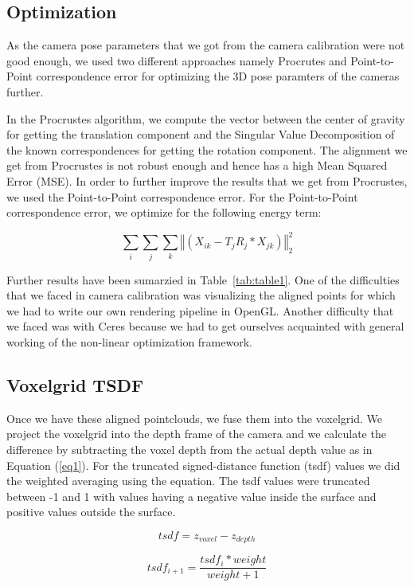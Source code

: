 \documentclass[10pt,twocolumn,letterpaper]{article}
\begin{document}
\subsection{Optimization}
As the camera pose parameters that we got from the camera calibration were not good enough, we used two different approaches namely Procrutes and Point-to-Point correspondence error for optimizing the 3D pose paramters of the cameras further.
 
In the Procrustes algorithm, we compute the vector between the center of gravity for getting the translation component and the Singular Value Decomposition of the known correspondences for getting the rotation component. The alignment we get from Procrustes is not robust enough and hence has a high Mean Squared Error (MSE). In order to further improve the results that we get from Procrustes, we used the Point-to-Point correspondence error. For the Point-to-Point correspondence error, we optimize for the following energy term:

$$
\sum_{i}\sum_{j}\sum_{k} \left\Vert\left(X_{ik} - T_jR_j*X_{jk}\right)\right\Vert_2^2
$$

Further results have been sumarzied in Table~\ref{tab:table1}. One of the difficulties that we faced in camera calibration was visualizing the aligned points for which we had to write our own rendering pipeline in OpenGL. Another difficulty that we faced was with Ceres because we had to get ourselves acquainted with general working of the non-linear optimization framework. 
\subsection{Voxelgrid TSDF}
Once we have these aligned pointclouds, we fuse them into the voxelgrid. We project the voxelgrid into the depth frame of the camera and we calculate the difference by subtracting the voxel depth from the actual depth value as in Equation (\ref{eq1}). For the truncated signed-distance function (tsdf) values we did the weighted averaging using the equation. The tsdf values were truncated between -1 and 1 with values having a negative value inside the surface and positive values outside the surface.

\begin{equation}\label{eq1}
tsdf=z_{voxel} - z_{depth}
\end{equation}

\begin{equation}\label{eq2}
tsdf_{i+1}=\frac{tsdf_{i} * weight}{weight+1}
\end{equation}
\end{document}
